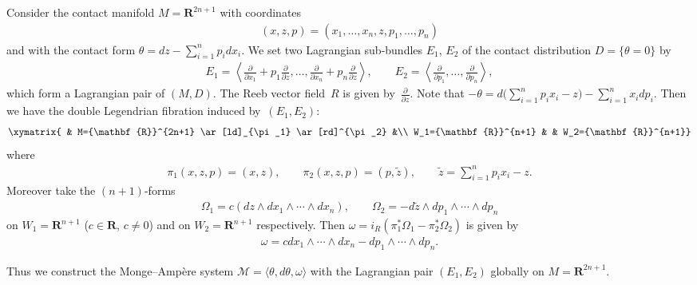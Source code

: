 \documentclass[11pt]{article}
\begin{document}
Consider the contact manifold
$M = {\mathbf{R}}^{2n+1}$ with coordinates
\begin{gather*}
(x, z, p) = (x_1, \dots, x_n, z, p_1, \dots, p_n)
\end{gather*}
and with the contact form
$\theta = dz - \sum\limits_{i=1}^n p_idx_i$.
We set two Lagrangian sub-bundles $E_1$, $E_2$
of the contact distribution $D=\{ \theta =0 \}$ by
\begin{gather*}
E_1  =
\left\langle \frac{\partial}{\partial x_1}+p_1\frac{\partial}{\partial z},
\dots,\frac{\partial}{\partial x_n}+p_n\frac{\partial}{\partial z}\right\rangle,
\qquad
E_2 =
\left\langle \frac{\partial}{\partial p_1},\dots,\frac{\partial}{\partial p_n}
\right\rangle,
\end{gather*}
which form a Lagrangian pair of $(M, D)$.
The Reeb vector f\/ield~$R$ is given by~$\frac{\partial}{\partial z}$.
Note that
$
- \theta = d\Big(\sum\limits_{i=1}^n p_ix_i - z\Big) - \sum\limits_{i=1}^n x_idp_i.
$
Then we have the double Legendrian f\/ibration induced by~$(E_1,E_2)$:
\begin{gather*}
\xymatrix{
& M={\mathbf{R}}^{2n+1} \ar[ld]_{\pi_1} \ar[rd]^{\pi_2}  &\\
W_1={\mathbf{R}}^{n+1} &  & W_2={\mathbf{R}}^{n+1}}
\end{gather*}
where
\begin{gather*}
\pi_1(x, z, p) = (x, z), \qquad
\pi_2(x, z, p) =
(p, \tilde{z}), \qquad \tilde{z} = \sum_{i=1}^n p_ix_i - z.
\end{gather*}
Moreover take the
$(n+1)$-forms
\begin{gather*}
\Omega_1
= c(dz \wedge dx_1\wedge \cdots \wedge dx_{n}),\qquad
\Omega_2
= - d\tilde{z} \wedge dp_1\wedge \cdots \wedge dp_{n}
\end{gather*}
on $W_1 = {\mathbf{R}}^{n+1}$
($c\in {\mathbf{R}}$, $c\not= 0$)
and
on $W_2 = {\mathbf{R}}^{n+1}$ respectively.
Then $\omega = i_R (\pi_1^*\Omega_1 - \pi_2^*\Omega_2)$
is given by
\begin{gather*}
\omega = c dx_1\wedge \cdots \wedge dx_{n} -
dp_1\wedge \cdots \wedge dp_{n}.
\end{gather*}

Thus we construct
the Monge--Amp{\`e}re system $\mathcal{M}=\langle \theta, d\theta,
\omega \rangle $
with the Lagrangian pair $(E_1,E_2)$ globally on $M={\mathbf{R}}^{2n+1}$.
\end{document}

